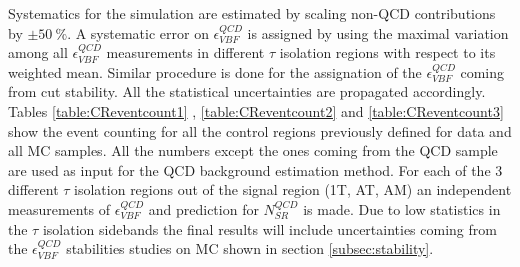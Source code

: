 Systematics for the simulation are estimated by scaling non-QCD contributions by $\pm50~\%$. A systematic error on $\epsilon^{QCD}_{VBF}$ is assigned by using the maximal variation among all $\epsilon^{QCD}_{VBF}$ measurements in different $\tau$ isolation regions with respect to its weighted mean. Similar procedure is done for the assignation of the $\epsilon^{QCD}_{VBF}$ coming from \met cut stability. All the statistical uncertainties are propagated accordingly. Tables \ref{table:CReventcount1} , \ref{table:CReventcount2} and \ref{table:CReventcount3} show the event counting for all the control regions previously defined for data and all MC samples. All the numbers except the ones coming from the QCD sample are used as input for the QCD background estimation method. For each of the 3 different $\tau$ isolation regions out of the signal region (1T, AT, AM) an independent measurements of $\epsilon^{QCD}_{VBF}$  and prediction for $N^{QCD}_{SR}$ is made. Due to low statistics in the $\tau$ isolation sidebands the final results will include uncertainties coming from the $\epsilon^{QCD}_{VBF}$ stabilities studies on MC shown in section \ref{subsec:stability}.
   






